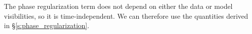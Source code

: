 \documentclass{article}
\newcommand\re{\operatorname{Re}}
\begin{document}
The phase regularization term does not depend on either the data or model visibilities, so it is time-independent. We can therefore use the quantities derived in \S\ref{s:phase_regularization}.

\begin{comment}
\section{Direction-Dependent Calibration}

For direction-dependent calibration, we replace the model visiblities $m_{jk} \rightarrow m_{jk}^\text{const} + \sum_l A_l m_{jk}^{(l)}$. Here $l$ indexes the directions to solve for. $A_l$ is the real-valued amplitude in those directions. We then get a $\chi$-squared of the form
\begin{equation}
    \chi^2(\boldsymbol{g}, \boldsymbol{A}) = \sum_{jk} \frac{1}{\sigma_{jk}^2} \left| m_{jk}^\text{const} + \sum_l A_l m_{jk}^{(l)} - g_j g_k^* v_{jk} \right|^2.
\end{equation}

Taking derivatives gives
\begin{equation}
    \frac{\partial \chi^2(\boldsymbol{g}, \boldsymbol{A})}{\partial A_{l'}} = \sum_{jk} \frac{2}{\sigma_{jk}^2} \re \left[ \left(m_{jk}^{(l')}\right)^* \left( m_{jk}^\text{const} + \sum_l A_l m_{jk}^{(l)} - g_j g_k^* v_{jk} \right) \right]
\end{equation}
and
\begin{equation}
    \frac{\partial^2 \chi^2(\boldsymbol{g}, \boldsymbol{A})}{\partial A_{l'} \partial A_{l''}} = \sum_{jk} \frac{2}{\sigma_{jk}^2} \re \left[ \left(m_{jk}^{(l')}\right)^* m_{jk}^{(l'')} \right].
\end{equation}


\section{Including Polarization}

We can now include polarization, such that we use all the visibility polarizations ($pp$, $qq$, $pq$, and $qp$) in calibration. Here we do not calibrate the crosspol gains. We continue to exclude autocorrelations in calibration and calibrate each frequency independently. Here we once again assume a single time step.

\subsection{Cost Function}


\end{comment}
\end{document}
